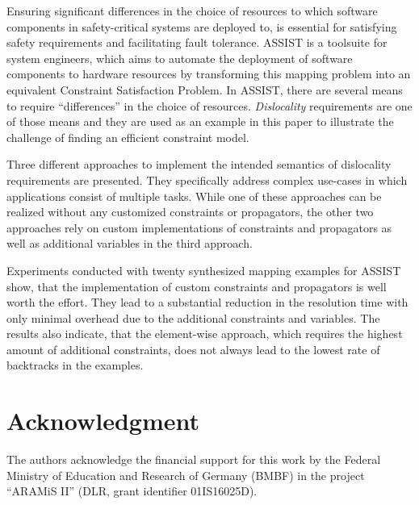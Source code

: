 \documentclass[english,biblatex]{lni}
\begin{document}
Ensuring significant differences in the choice of resources to which software components in safety-critical systems are deployed to, is essential for satisfying safety requirements and facilitating fault tolerance.
ASSIST is a toolsuite for system engineers, which aims to automate the deployment of software components to hardware resources by transforming this mapping problem into an equivalent Constraint Satisfaction Problem.
In ASSIST, there are several means to require ``differences'' in the choice of resources.
\emph{Dislocality} requirements are one of those means and they are used as an example in this paper to illustrate the challenge of finding an efficient constraint model.

Three different approaches to implement the intended semantics of dislocality requirements are presented.
They specifically address complex use-cases in which applications consist of multiple tasks.
While one of these approaches can be realized without any customized constraints or propagators, the other two approaches rely on custom implementations of constraints and propagators as well as additional variables in the third approach.

Experiments conducted with twenty synthesized mapping examples for ASSIST show, that the implementation of custom constraints and propagators is well worth the effort.
They lead to a substantial reduction in the resolution time with only minimal overhead due to the additional constraints and variables.
The results also indicate, that the element-wise approach, which requires the highest amount of additional constraints, does not always lead to the lowest rate of backtracks in the examples.

\section*{Acknowledgment}

The authors acknowledge the financial support for this work by the Federal Ministry of Education and Research of Germany (BMBF) in the project ``ARAMiS II'' (DLR, grant identifier 01IS16025D).


\printbibliography[heading=bibintoc]
\end{document}
